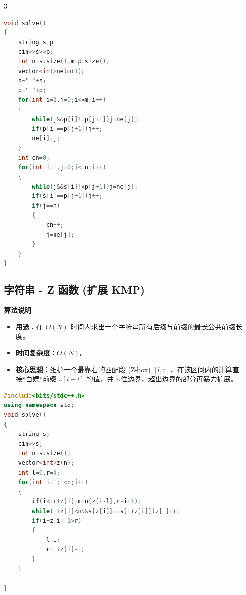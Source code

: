 \documentclass[10pt,landscape,a4paper]{article}
\begin{document}
\begin{multicols*}{3}
\begin{lstlisting}[language=C++]
void solve()
{
    string s,p;
    cin>>s>>p;
    int n=s.size(),m=p.size();
    vector<int>ne(m+1);
    s=" "+s;
    p=" "+p;
    for(int i=2,j=0;i<=m;i++)
    {
        while(j&&p[i]!=p[j+1])j=ne[j];
        if(p[i]==p[j+1])j++;
        ne[i]=j;
    }
    int cn=0;
    for(int i=1,j=0;i<=n;i++)
    {
        while(j&&s[i]!=p[j+1])j=ne[j];
        if(s[i]==p[j+1])j++;
        if(j==m)
        {
            cn++;
            j=ne[j];
        }
    }
}
\end{lstlisting}
\subsection*{字符串 - Z 函数 (扩展 KMP)}
\par\addvspace{0.7ex}\noindent\textbf{算法说明}\par\nobreak
\begin{itemize}
\item \textbf{用途}：在 $O(N)$ 时间内求出一个字符串所有后缀与前缀的最长公共前缀长度。
\item \textbf{时间复杂度}：$O(N)$。
\item \textbf{核心思想}：维护一个最靠右的匹配段 (Z-box) $[l, r]$，在该区间内的计算直接“白嫖”前缀 $z[i-l]$ 的值，并卡住边界，超出边界的部分再暴力扩展。
\end{itemize}
\par{}\par
\begin{lstlisting}[language=C++]
#include<bits/stdc++.h>
using namespace std;
void solve()
{
    string s;
    cin>>s;
    int n=s.size();
    vector<int>z(n);
    int l=0,r=0;
    for(int i=1;i<n;i++)
    {
        if(i<=r)z[i]=min(z[i-l],r-i+1);
        while(i+z[i]<n&&s[z[i]]==s[i+z[i]])z[i]++;
        if(i+z[i]-1>r)
        {
            l=i;
            r=i+z[i]-1;
        }
    }

}
\end{lstlisting}

\end{multicols*}
\end{document}
